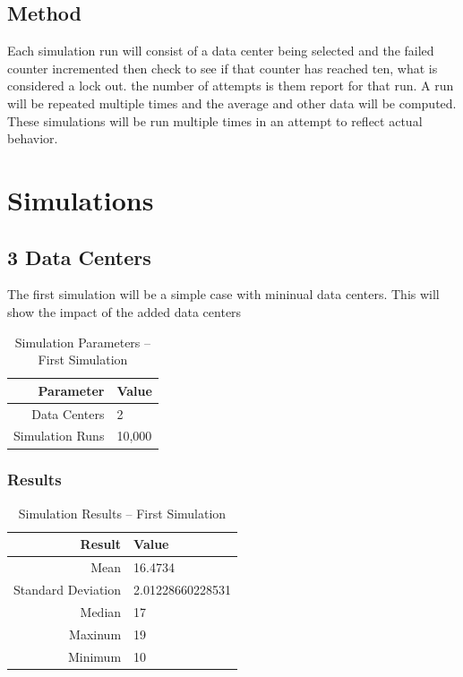 \documentclass[11pt, letterpaper]{article}
\begin{document}
\subsection{Method}
Each simulation run will consist of a data center being selected and the
failed counter incremented then check to see if that counter has reached
ten, what is considered a lock out. the number of attempts is them report
for that run. A run will be repeated multiple times and the average and
other data will be computed. These simulations will be run multiple times in an
attempt to reflect actual behavior.


\section{Simulations}
\subsection{3 Data Centers}
The first simulation will be a simple case with mininual data centers. This will
show the impact of the added data centers

\begin{table}[H]
	\centering
	\caption{Simulation Parameters -- First Simulation}
	\begin{tabular}{||r|l||}
		\hline \hline
		Parameter & Value \\ \hline \hline
		Data Centers & 2 \\ \hline
		Simulation Runs & 10,000 \\ \hline \hline
	\end{tabular}
	\label{tab:Sim1_set}
\end{table}


\subsubsection*{Results}
\begin{table}[H]
	\centering
	\caption{Simulation Results -- First Simulation}
	\begin{tabular}{||r|l||}
		\hline \hline
		Result                  & Value                     \\ \hline \hline
		Mean                    & 16.4734    \\ \hline
		Standard Deviation      & 2.01228660228531    \\ \hline
		Median                  & 17    \\ \hline
		Maxinum                 & 19    \\ \hline
		Minimum                 & 10    \\ \hline \hline
	\end{tabular}
	\label{tab:Sim1_res}
\end{table}
\end{document}
